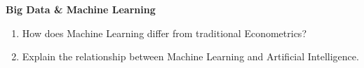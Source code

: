 \documentclass{./../../Latex/handout}
\begin{document}
\textbf{Big Data \& Machine Learning} \vspace{-1em}
\begin{enumerate}
\item How does Machine Learning differ from traditional Econometrics?
\item Explain the relationship between Machine Learning and Artificial Intelligence.
\end{enumerate}
\end{document}
